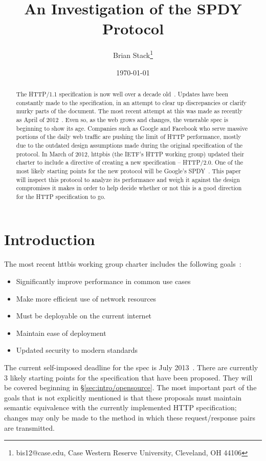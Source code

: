\documentclass[11pt,letterpaper,notitlepage]{article}
\title{An Investigation of the SPDY Protocol}
\date{\today}
\author{Brian Stack\thanks{ bis12@case.edu, Case Western Reserve University,
Cleveland, OH 44106}}
\begin{document}
\maketitle
\setcounter{tocdepth}{1}
\tableofcontents 
\begin{abstract}
The HTTP/1.1 specification is now well over a decade old~\cite{rfc2616}. Updates
have been constantly made to the specification, in an attempt to clear up
discrepancies or clarify murky parts of the document.  The most recent attempt
at this was made as recently as April of 2012~\cite{rfc6585}.  Even so, as the web grows
and changes, the venerable spec is beginning to show its age.  Companies such as
Google and Facebook who serve massive portions of the daily web traffic are
pushing the limit of HTTP performance, mostly due to the outdated design
assumptions made during the original specification of the protocol.  In March of
2012, httpbis (the IETF's HTTP working group) updated their charter to
include a directive of creating a new specification -- HTTP/2.0.  One of the
most likely starting points for the new protocol will be Google's
SPDY~\cite{spdyspec}.  This paper will inspect this protocol to analyze its
performance and weigh it against the design compromises it makes in order to
help decide whether or not this is a good direction for the HTTP specification
to go.
\end{abstract}

\section{Introduction}
\label{sec:intro}
The most recent httbis working group charter includes the following
goals~\cite{httpbis-charter}:
\begin{itemize}
\item Significantly improve performance in common use cases
\item Make more efficient use of network resources
\item Must be deployable on the current internet
\item Maintain ease of deployment
\item Updated security to modern standards
\end{itemize}
The current self-imposed deadline for the spec is July
2013~\cite{httpbis-charter}.  There are currently 3 likely starting points for
the specification that have been proposed. They will be covered beginning in
\S\ref{sec:intro/opensource}. The most important part of the goals that is not
explicitly mentioned is that these proposals must maintain semantic equivalence
with the currently implemented HTTP specification; changes may only be made to
the method in which these request/response pairs are transmitted.
\end{document}
